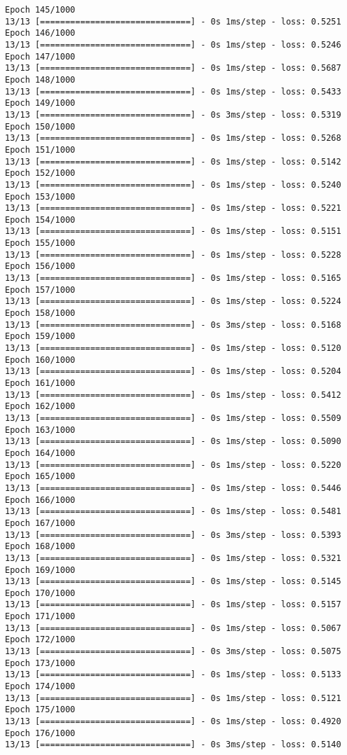 \documentclass[11pt]{article}
\begin{document}
\begin{Verbatim}[commandchars=\\\{\}]
Epoch 145/1000
13/13 [==============================] - 0s 1ms/step - loss: 0.5251
Epoch 146/1000
13/13 [==============================] - 0s 1ms/step - loss: 0.5246
Epoch 147/1000
13/13 [==============================] - 0s 1ms/step - loss: 0.5687
Epoch 148/1000
13/13 [==============================] - 0s 1ms/step - loss: 0.5433
Epoch 149/1000
13/13 [==============================] - 0s 3ms/step - loss: 0.5319
Epoch 150/1000
13/13 [==============================] - 0s 1ms/step - loss: 0.5268
Epoch 151/1000
13/13 [==============================] - 0s 1ms/step - loss: 0.5142
Epoch 152/1000
13/13 [==============================] - 0s 1ms/step - loss: 0.5240
Epoch 153/1000
13/13 [==============================] - 0s 1ms/step - loss: 0.5221
Epoch 154/1000
13/13 [==============================] - 0s 1ms/step - loss: 0.5151
Epoch 155/1000
13/13 [==============================] - 0s 1ms/step - loss: 0.5228
Epoch 156/1000
13/13 [==============================] - 0s 1ms/step - loss: 0.5165
Epoch 157/1000
13/13 [==============================] - 0s 1ms/step - loss: 0.5224
Epoch 158/1000
13/13 [==============================] - 0s 3ms/step - loss: 0.5168
Epoch 159/1000
13/13 [==============================] - 0s 1ms/step - loss: 0.5120
Epoch 160/1000
13/13 [==============================] - 0s 1ms/step - loss: 0.5204
Epoch 161/1000
13/13 [==============================] - 0s 1ms/step - loss: 0.5412
Epoch 162/1000
13/13 [==============================] - 0s 1ms/step - loss: 0.5509
Epoch 163/1000
13/13 [==============================] - 0s 1ms/step - loss: 0.5090
Epoch 164/1000
13/13 [==============================] - 0s 1ms/step - loss: 0.5220
Epoch 165/1000
13/13 [==============================] - 0s 1ms/step - loss: 0.5446
Epoch 166/1000
13/13 [==============================] - 0s 1ms/step - loss: 0.5481
Epoch 167/1000
13/13 [==============================] - 0s 3ms/step - loss: 0.5393
Epoch 168/1000
13/13 [==============================] - 0s 1ms/step - loss: 0.5321
Epoch 169/1000
13/13 [==============================] - 0s 1ms/step - loss: 0.5145
Epoch 170/1000
13/13 [==============================] - 0s 1ms/step - loss: 0.5157
Epoch 171/1000
13/13 [==============================] - 0s 1ms/step - loss: 0.5067
Epoch 172/1000
13/13 [==============================] - 0s 3ms/step - loss: 0.5075
Epoch 173/1000
13/13 [==============================] - 0s 1ms/step - loss: 0.5133
Epoch 174/1000
13/13 [==============================] - 0s 1ms/step - loss: 0.5121
Epoch 175/1000
13/13 [==============================] - 0s 1ms/step - loss: 0.4920
Epoch 176/1000
13/13 [==============================] - 0s 3ms/step - loss: 0.5140

\end{Verbatim}
\end{document}
